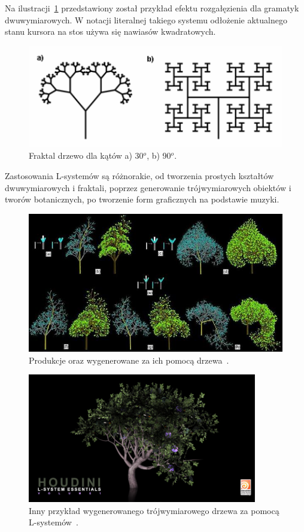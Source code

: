 Na ilustracji~\ref{fractal03} przedstawiony został przykład efektu rozgałęzienia
dla gramatyk dwuwymiarowych. W notacji literalnej takiego systemu odłożenie
aktualnego stanu kursora na stos używa się nawiasów kwadratowych.

\begin{figure}[h!]
  \centering
  \includegraphics{images/fractal03.png}
  \caption{Fraktal drzewo dla kątów a) 30$^o$, b) 90$^o$.\cite{gaudi}}
  \label{fractal03}
\end{figure}

Zastosowania L-systemów są różnorakie, od tworzenia prostych kształtów
dwuwymiarowych i fraktali, poprzez generowanie trójwymiarowych obiektów i tworów
botanicznych, po tworzenie form graficznych na podstawie muzyki.

\begin{figure}[h!]
  \centering
  \includegraphics[width=12cm]{images/l-system01.jpg}
  \caption{Produkcje oraz wygenerowane za ich pomocą drzewa~\cite{ls01}.}
  \label{l-system01}
\end{figure}

\begin{figure}[h!]
  \centering
  \includegraphics[width=10cm]{images/l-system02.jpg}
  \caption{Inny przykład wygenerowanego trójwymiarowego drzewa za pomocą
  L-systemów~\cite{ls02}.}
  \label{l-system02}
\end{figure}

